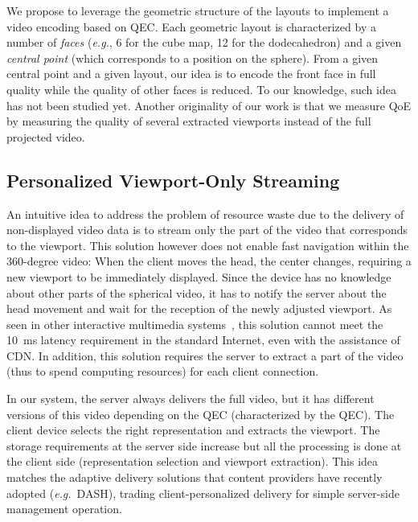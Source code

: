 We propose to leverage the geometric
structure of the layouts to implement a video encoding based on
\ac{QEC}. Each geometric layout is characterized by a number of
\emph{faces} (\textit{e.g.}, 6 for the cube map, 12 for the
dodecahedron) and a given \emph{central point} (which corresponds to a
position on the sphere).
From a given central point and a given layout, our idea is to encode
the front face in full quality while the quality of other faces is
reduced.
To our knowledge, such idea has not been studied yet.
Another originality of our work is that we measure \ac{QoE} by
measuring the quality of several extracted viewports instead of
the full projected video.

\subsection{Personalized Viewport-Only Streaming}

An intuitive idea to address the problem of resource waste due to the
delivery of non-displayed video data is to stream only the part of the video that
corresponds to the viewport. This solution however does not enable
fast navigation within the $360$-degree video: When the client moves the
head, the \FoV{} center changes, requiring a new viewport to be
immediately displayed. Since the device has no knowledge about other
parts of the spherical video, it has to notify the server about the
head movement and wait for the reception of the newly adjusted viewport.
As seen in other interactive multimedia
systems~\cite{ChoyWSR14}, this solution cannot meet the \SI{10}{ms} latency
requirement in the standard Internet, even with the assistance of
\ac{CDN}. In addition, this solution requires the server to extract a
part of the video (thus to spend computing resources) for each client
connection.

In our system, the server always delivers
the full video, but it has different versions of this video depending
on the \ac{QEC} (characterized by the \ac{QEC}). The client device
selects the right representation and extracts the viewport. The
storage requirements at the server side increase but all the
processing is done at the client side (representation selection and
viewport extraction). This idea matches the adaptive delivery
solutions that content providers have recently adopted (\textit{e.g.}~\ac{DASH}), trading client-personalized delivery for
simple server-side management operation.

